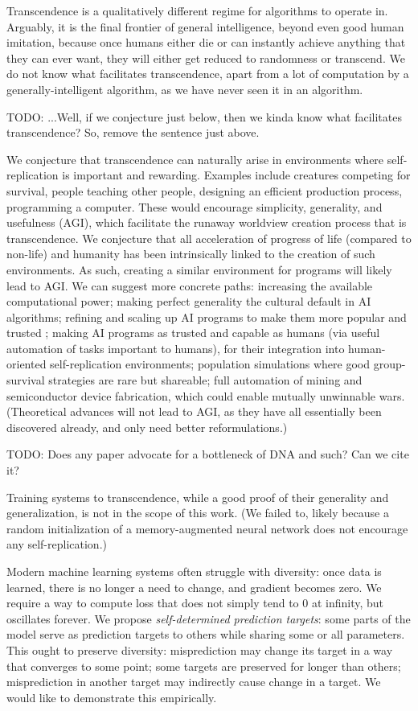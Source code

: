 \documentclass{article}
\begin{document}
Transcendence is a qualitatively different regime for algorithms to operate in. Arguably, it is the final frontier of general intelligence, beyond even good human imitation, because once humans either die or can instantly achieve anything that they can ever want, they will either get reduced to randomness or transcend. We do not know what facilitates transcendence, apart from a lot of computation by a generally-intelligent algorithm, as we have never seen it in an algorithm.

    TODO: ...Well, if we conjecture just below, then we kinda know what facilitates transcendence? So, remove the sentence just above.

We conjecture that transcendence can naturally arise in environments where self-replication is important and rewarding. Examples include creatures competing for survival, people teaching other people, designing an efficient production process, programming a computer. These would encourage simplicity, generality, and usefulness (AGI), which facilitate the runaway worldview creation process that is transcendence. We conjecture that all acceleration of progress of life (compared to non-life) and humanity has been intrinsically linked to the creation of such environments. As such, creating a similar environment for programs will likely lead to AGI. We can suggest more concrete paths: increasing the available computational power; making perfect generality the cultural default in AI algorithms; refining and scaling up AI programs to make them more popular and trusted \cite{NEURIPS2020_1457c0d6}; making AI programs as trusted and capable as humans (via useful automation of tasks important to humans), for their integration into human-oriented self-replication environments; population simulations where good group-survival strategies are rare but shareable; full automation of mining and semiconductor device fabrication, which could enable mutually unwinnable wars. (Theoretical advances will not lead to AGI, as they have all essentially been discovered already, and only need better reformulations.)

    TODO: Does any paper advocate for a bottleneck of DNA and such? Can we cite it?

Training systems to transcendence, while a good proof of their generality and generalization, is not in the scope of this work. (We failed to, likely because a random initialization of a memory-augmented neural network does not encourage any self-replication.)

Modern machine learning systems often struggle with diversity: once data is learned, there is no longer a need to change, and gradient becomes zero. We require a way to compute loss that does not simply tend to $0$ at infinity, but oscillates forever. We propose \textit{self-determined prediction targets}: some parts of the model serve as prediction targets to others while sharing some or all parameters. This ought to preserve diversity: misprediction may change its target in a way that converges to some point; some targets are preserved for longer than others; misprediction in another target may indirectly cause change in a target. We would like to demonstrate this empirically.
\end{document}

